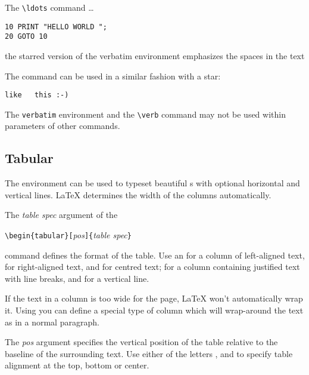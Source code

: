 \begin{example}
The \verb|\ldots| command \ldots

\begin{verbatim}
10 PRINT "HELLO WORLD ";
20 GOTO 10
\end{verbatim}
\end{example}

\begin{example}
\begin{verbatim*}
the starred version of
the      verbatim   
environment emphasizes
the spaces   in the text
\end{verbatim*}
\end{example}

The  command can be used in a similar fashion with a star:

\begin{example}
\verb*|like   this :-) |
\end{example}

The \texttt{verbatim} environment and the \verb|\verb| command may not be used
within parameters of other commands.

 
\subsection{Tabular}

\newcommand{\mfr}[1]{\framebox{\rule{0pt}{0.7em}\texttt{#1}}}

The  environment can be used to typeset beautiful
s with optional horizontal and vertical lines. \LaTeX{}
determines the width of the columns automatically.

The \emph{table spec} argument of the 
\begin{lscommand}
\verb|\begin{tabular}[|\emph{pos}\verb|]{|\emph{table spec}\verb|}|
\end{lscommand} 
\noindent command defines the format of the table. Use an \mfr{l} for a column of
left-aligned text, \mfr{r} for right-aligned text, and \mfr{c} for
centred text; \mfr{p\{\emph{width}\}} for a column containing justified
text with line breaks, and \mfr{|} for a vertical line.

If the text in a column is too wide for the page, \LaTeX{} won't
automatically wrap it. Using \mfr{p\{\emph{width}\}} you can define
a special type of column which will wrap-around the text as in a normal paragraph.

The \emph{pos} argument specifies the vertical position of the table
relative to the baseline of the surrounding text.  Use either of the
letters \mfr{t}, \mfr{b} and \mfr{c} to specify table
alignment at the top, bottom or center.
 
